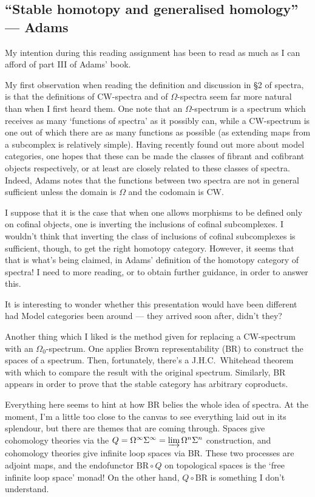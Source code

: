 \documentclass[11pt]{article}
\newcommand{\KanSemResponse}[1]
{
\thispagestyle{fancy}
\subsection*{#1}
}
\begin{document}
\begin{AdamsStableHtpy}
\KanSemResponse
{``Stable homotopy and generalised homology'' --- Adams}
My intention during this reading assignment has been to read as much as I can afford of part III of Adams' book.

My first observation when reading the definition and discussion in \S2 of spectra, is that the definitions of CW-spectra and of $\Omega$-spectra seem far more natural than when I first heard them. One note that an $\Omega$-spectrum is a spectrum which receives as many `functions of spectra' as it possibly can, while a CW-spectrum is one out of which there are as many functions as possible (as extending maps from a subcomplex is relatively simple). Having recently found out more about model categories, one hopes that these can be made the classes of fibrant and cofibrant objects respectively, or at least are closely related to these classes of spectra. Indeed, Adams notes that the functions between two spectra are not in general sufficient unless the domain is $\Omega$ and the codomain is CW.

I suppose that it is the case that when one allows morphisms to be defined only on cofinal objects, one is inverting the inclusions of cofinal subcomplexes. I wouldn't think that inverting the class of inclusions of cofinal subcomplexes is sufficient, though, to get the right homotopy category. However, it seems that that is what's being claimed, in Adams' definition of the homotopy category of spectra! I need to more reading, or to obtain further guidance, in order to answer this.

It is interesting to wonder whether this presentation would have been different had Model categories been around --- they arrived soon after, didn't they? 

Another thing which I liked is the method given for replacing a CW-spectrum with an $\Omega_0$-spectrum. One applies Brown representability (BR) to construct the spaces of a spectrum. Then, fortunately, there's a J.H.C.\ Whitehead theorem with which to compare the result with the original spectrum. Similarly, BR appears in order to prove that the stable category has arbitrary coproducts. 

Everything here seems to hint at how BR belies the whole idea of spectra. At the moment, I'm a little too close to the canvas to see everything laid out in its splendour, but there are themes that are coming through. Spaces give cohomology theories via the $Q=\Omega^\infty\Sigma^\infty=\varinjlim \Omega^n\Sigma^n$ construction, and cohomology theories give infinite loop spaces via BR. These two processes are adjoint maps, and the endofunctor $\text{BR}\circ Q$ on topological spaces is the `free infinite loop space' monad! On the other hand, $Q\circ\text{BR}$ is something I don't understand.


\end{AdamsStableHtpy}
\end{document}
